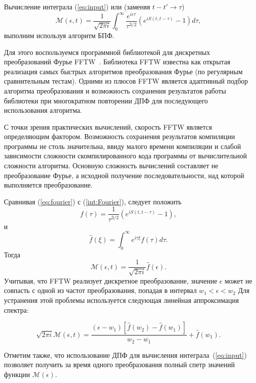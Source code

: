 \documentclass[14pt, a4paper]{article}
\numberwithin{figure}{section}
\numberwithin{equation}{section}
\newcommand{\cM}{\mathcal{M}}
\begin{document}
Вычисление интеграла (\ref{eq:input}) или (заменяя $t - t' \to \tau$)
\begin{equation}\label{eq:fourier}
\cM (\epsilon,t) = \frac{1}{\sqrt{2\pi i}}\int_{0}^{\infty}\frac{e^{i\epsilon \tau}}{{\tau}^{3/2}}(e^{i S(t, t-\tau)} - 1) d\tau,
\end{equation}
выполним используя алгоритм БПФ.

Для этого воспользуемся программной библиотекой для дискретных преобразований Фурье FFTW~\cite{fftw:website}.
Библиотека FFTW известна как открытая реализация самых быстрых алгоритмов преобразования Фурье (по регулярным сравнительным тестам). 
Одними из плюсов FFTW является адаптивный подбор алгоритма преобразования и возможность сохранения результатов работы библиотеки при многократном повторении ДПФ для последующего использования алгоритма.

С точки зрения практических вычислений, скорость FFTW является определяющим фактором. Возможность сохранения результатов компиляции программы не столь значительна, ввиду малого времени компиляции и слабой зависимости сложности скомпилированного кода программы от вычислительной сложности алгоритма. Основную сложность вычислений составляет не преобразование Фурье, а исходной получение последовательности, над которой выполняется преобразование.

Сравнивая (\ref{eq:fourier}) с (\ref{int:Fourier}), следует положить
$$ 
f(\tau) = \frac{1}{{\tau}^{3/2}}(e^{i S(t, t-\tau)} - 1),
$$
и
$$
\hat{f}(\xi) = \int_{0}^{\infty} e^{i \tau \xi} f(\tau) d\tau.
$$
Тогда 
$$
\cM(\epsilon,t)=\frac{1}{\sqrt{2\pi i}} \hat{f}(\epsilon).
$$
Учитывая, что FFTW реализует дискретное преобразование, значение $\epsilon$ может не совпасть с одной из частот преобразования, попадая в интервал $w_1<\epsilon<w_2$ Для устранения этой проблемы используется следующая линейная аппроксимация спектра:

\begin{equation}\label{eq:approx}
\sqrt{2\pi i}\cM(\epsilon,t) = \frac{(\epsilon - w_1) [\hat{f}(w_2) - \hat{f}(w_1)]}{w_2 - w_1} + \hat{f}(w_1).
\end{equation}

Отметим также, что использование ДПФ для вычисления интеграла~(\ref{eq:input}) позволяет получить за время одного преобразования полный спетр значений функции $\cM(\epsilon)$.
\end{document}
